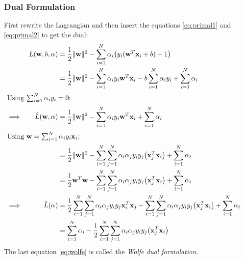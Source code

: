 \documentclass[a4paper, 11pt, accentcolor = tud3b]{tudreport}
\renewcommand{\vec}[1]{\mathbf{#1}}
\begin{document}
				\subsubsection{Dual Formulation} %
					First rewrite the Lagrangian and then insert the equations \ref{eq:primal1} and \ref{eq:primal2} to get the dual:
					\begin{align}
						&& L(\vec{w}, b, \vec{\alpha}) &= \frac{1}{2} \lVert \vec{w} \rVert^2 - \sum_{i = 1}^{N} \alpha_i \big( y_i (\vec{w}^T \vec{x}_i + b) - 1 \big) & \\
						&& &= \frac{1}{2} \lVert \vec{w} \rVert^2 - \sum_{i = 1}^{N} \alpha_i y_i \vec{w}^T \vec{x}_i - b \sum_{i = 1}^{N} \alpha_i y_i + \sum_{i = 1}^{N} \alpha_i & \\
						\intertext{Using \( \sum_{i = 1}^{N} \alpha_i y_i = 0 \):}
						\implies && \hat{L}(\vec{w}, \vec{\alpha}) &= \frac{1}{2} \lVert \vec{w} \rVert^2 - \sum_{i = 1}^{N} \alpha_i y_i \vec{w}^T \vec{x}_i + \sum_{i = 1}^{N} \alpha_i & \\
						\intertext{Using \( \vec{w} = \sum_{i = 1}^{N} \alpha_i y_i \vec{x}_i \):}
						&& &= \frac{1}{2} \lVert \vec{w} \rVert^2 - \sum_{i = 1}^{N} \sum_{j = 1}^{N} \alpha_i \alpha_j y_i y_j \big(\vec{x}_j^T \vec{x}_i\big) + \sum_{i = 1}^{N} \alpha_i & \\
						&& &= \frac{1}{2} \vec{w}^T \vec{w} - \sum_{i = 1}^{N} \sum_{j = 1}^{N} \alpha_i \alpha_j y_i y_j \big(\vec{x}_j^T \vec{x}_i\big) + \sum_{i = 1}^{N} \alpha_i & \\
						\implies && \tilde{L}(\vec{\alpha}) &= \frac{1}{2} \sum_{i = 1}^{N} \sum_{j = 1}^{N} \alpha_i \alpha_j y_i y_j \vec{x}_i^T \vec{x}_j - \sum_{i = 1}^{N} \sum_{j = 1}^{N} \alpha_i \alpha_j y_i y_j \big(\vec{x}_j^T \vec{x}_i\big) + \sum_{i = 1}^{N} \alpha_i & \\
						&& &= \sum_{i = 1}^{N} \alpha_i - \frac{1}{2} \sum_{i = 1}^{N} \sum_{j = 1}^{N} \alpha_i \alpha_j y_i y_j \big(\vec{x}_j^T \vec{x}_i\big) & \label{eq:wolfe}
					\end{align}
					The last equation \ref{eq:wolfe} is called the \emph{Wolfe dual formulation}.
					
\end{document}
